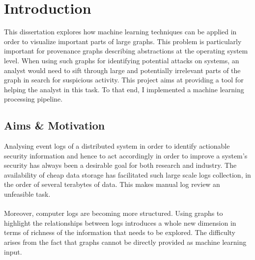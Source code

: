 
	
	\chapter{Introduction}
	
	This dissertation explores how machine learning techniques can be applied in order to visualize important parts of large graphs. This problem is particularly important for provenance graphs describing abstractions at the operating system level. When using such graphs for identifying potential attacks on systems, an analyst would need to sift through large and potentially irrelevant parts of the graph in search for suspicious activity. This project aims at providing a tool for helping the analyst in this task. To that end, I implemented a machine learning processing pipeline.  
	
	\section{Aims \& Motivation}  \label{1.1}
	Analysing event logs of a distributed system in order to identify actionable security information and hence to act accordingly in order to improve a system's security has always been a desirable goal for both research and industry. The availability of cheap data storage has facilitated such large scale logs collection, in the order of several terabytes of data. This makes manual log review an unfeasible task. 
	\\ \\
	Moreover, computer logs are becoming more structured. Using graphs to highlight the relationships between logs introduces a whole new dimension in terms of richness of the information that needs to be explored. The difficulty arises from the fact that graphs cannot be directly provided as machine learning input.
	
